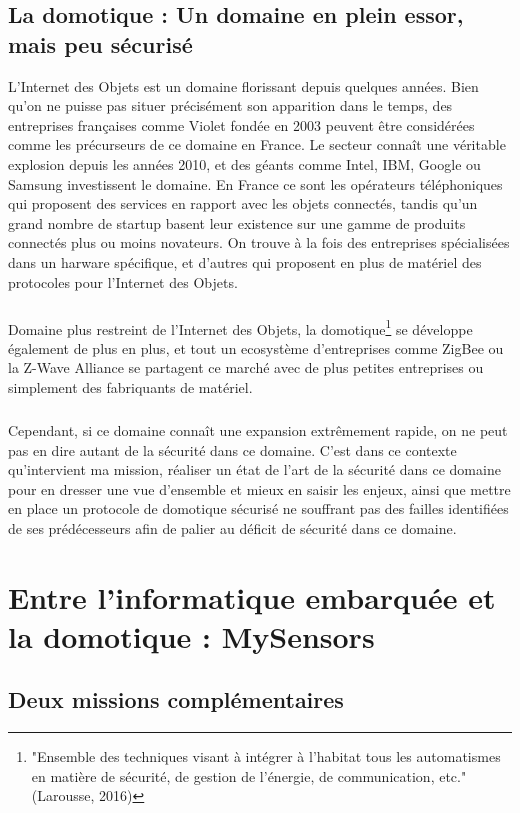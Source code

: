 \documentclass[12 pt]{report}
\begin{document}
\section{La domotique : Un domaine en plein essor, mais peu sécurisé}
L'Internet des Objets est un domaine florissant depuis quelques années. Bien qu'on ne puisse pas situer précisément son apparition dans le temps, des entreprises françaises comme Violet fondée en 2003 peuvent être considérées comme les précurseurs de ce domaine en France. Le secteur connaît une véritable explosion depuis les années 2010, et des géants comme Intel, IBM, Google ou Samsung investissent le domaine. En France ce sont les opérateurs téléphoniques qui proposent des services en rapport avec les objets connectés, tandis qu'un grand nombre de startup basent leur existence sur une gamme de produits connectés plus ou moins novateurs. On trouve à la fois des entreprises spécialisées dans un harware spécifique, et d'autres qui proposent en plus de matériel des protocoles pour l'Internet des Objets.
\paragraph{}Domaine plus restreint de l'Internet des Objets, la domotique\footnote{"Ensemble des techniques visant à intégrer à l'habitat tous les automatismes en matière de sécurité, de gestion de l'énergie, de communication, etc."(Larousse, 2016)} se développe également de plus en plus, et tout un ecosystème d'entreprises comme ZigBee ou la Z-Wave Alliance se partagent ce marché avec de plus petites entreprises ou simplement des fabriquants de matériel.
\paragraph{}Cependant, si ce domaine connaît une expansion extrêmement rapide, on ne peut pas en dire autant de la sécurité dans ce domaine. C'est dans ce contexte qu'intervient ma mission, réaliser un état de l'art de la sécurité dans ce domaine pour en dresser une vue d'ensemble et mieux en saisir les enjeux, ainsi que mettre en place un protocole de domotique sécurisé ne souffrant pas des failles identifiées de ses prédécesseurs afin de palier au déficit de sécurité dans ce domaine.

\chapter{Entre l'informatique embarquée et la domotique : MySensors}
\section{Deux missions complémentaires}
\end{document}
